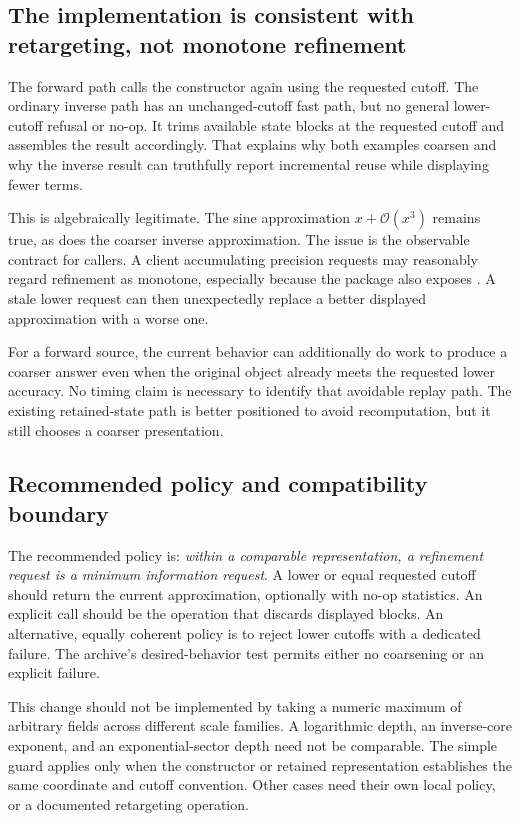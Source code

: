 \documentclass[11pt,letterpaper]{article}
\newcommand{\code}[1]{\texttt{\detokenize{#1}}}
\newcommand{\OO}{\mathcal{O}}
\begin{document}
\subsection{The implementation is consistent with retargeting, not monotone refinement}
The forward path calls the constructor again using the requested cutoff. The ordinary inverse path has an unchanged-cutoff fast path, but no general lower-cutoff refusal or no-op. It trims available state blocks at the requested cutoff and assembles the result accordingly. That explains why both examples coarsen and why the inverse result can truthfully report incremental reuse while displaying fewer terms.\cite{repo-ops,repo-refinement}

This is algebraically legitimate. The sine approximation $x+\OO(x^3)$ remains true, as does the coarser inverse approximation. The issue is the observable contract for callers. A client accumulating precision requests may reasonably regard refinement as monotone, especially because the package also exposes \code{SeriesTruncate}. A stale lower request can then unexpectedly replace a better displayed approximation with a worse one.

For a forward source, the current behavior can additionally do work to produce a coarser answer even when the original object already meets the requested lower accuracy. No timing claim is necessary to identify that avoidable replay path. The existing retained-state path is better positioned to avoid recomputation, but it still chooses a coarser presentation.

\subsection{Recommended policy and compatibility boundary}
The recommended policy is: \emph{within a comparable representation, a refinement request is a minimum information request}. A lower or equal requested cutoff should return the current approximation, optionally with no-op statistics. An explicit \code{SeriesTruncate} call should be the operation that discards displayed blocks. An alternative, equally coherent policy is to reject lower cutoffs with a dedicated failure. The archive's desired-behavior test permits either no coarsening or an explicit failure.

This change should not be implemented by taking a numeric maximum of arbitrary \code{"Cutoff"} fields across different scale families. A logarithmic depth, an inverse-core exponent, and an exponential-sector depth need not be comparable. The simple guard applies only when the constructor or retained representation establishes the same coordinate and cutoff convention. Other cases need their own local policy, or a documented retargeting operation.
\end{document}
